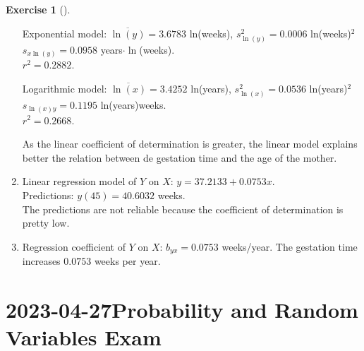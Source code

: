 \documentclass[
  a4paper,
]{scrreport}
\theoremstyle{definition}
\newtheorem{exercise}{Exercise}[chapter]
\theoremstyle{remark}
\begin{document}
\begin{exercise}[]
\begin{tcolorbox}
\begin{enumerate}
  Exponential model: \(\overline{\ln(y)} = 3.6783\) ln(weeks),
  \(s_{\ln(y)}^2 = 0.0006\) ln(weeks)\(^2\)\\
  \(s_{x\ln(y)} = 0.0958\) years\(\cdot\ln\)(weeks).\\
  \(r^2 = 0.2882\).

  Logarithmic model: \(\overline{\ln(x)} = 3.4252\) ln(years),
  \(s_{\ln(x)}^2 = 0.0536\) ln(years)\(^2\)\\
  \(s_{\ln(x)y} = 0.1195\) ln(years)weeks.\\
  \(r^2 = 0.2668\).

  As the linear coefficient of determination is greater, the linear
  model explains better the relation between de gestation time and the
  age of the mother.
\item
  Linear regression model of \(Y\) on \(X\):
  \(y = 37.2133 + 0.0753 x\).\\
  Predictions: \(y(45) = 40.6032\) weeks.\\
  The predictions are not reliable because the coefficient of
  determination is pretty low.
\item
  Regression coefficient of \(Y\) on \(X\): \(b_{yx} = 0.0753\)
  weeks/year. The gestation time increases \(0.0753\) weeks per year.
\end{enumerate}

\end{tcolorbox}

\end{exercise}


\hypertarget{probability-and-random-variables-exam-2}{%
\chapter{\texorpdfstring{2023-04-27Probability and Random Variables
Exam}{2023-04-27 Probability and Random Variables Exam}}\label{probability-and-random-variables-exam-2}}
\end{document}

